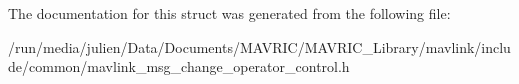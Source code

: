 The documentation for this struct was generated from the following file\+:\begin{DoxyCompactItemize}
\item 
/run/media/julien/\+Data/\+Documents/\+M\+A\+V\+R\+I\+C/\+M\+A\+V\+R\+I\+C\+\_\+\+Library/mavlink/include/common/mavlink\+\_\+msg\+\_\+change\+\_\+operator\+\_\+control.\+h\end{DoxyCompactItemize}

